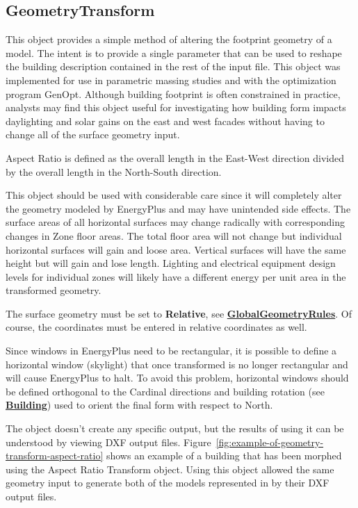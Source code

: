 \subsection{GeometryTransform}\label{geometrytransform}

This object provides a simple method of altering the footprint geometry of a model. The intent is to provide a single parameter that can be used to reshape the building description contained in the rest of the input file. This object was implemented for use in parametric massing studies and with the optimization program GenOpt. Although building footprint is often constrained in practice, analysts may find this object useful for investigating how building form impacts daylighting and solar gains on the east and west facades without having to change all of the surface geometry input.

Aspect Ratio is defined as the overall length in the East-West direction divided by the overall length in the North-South direction.

This object should be used with considerable care since it will completely alter the geometry modeled by EnergyPlus and may have unintended side effects. The surface areas of all horizontal surfaces may change radically with corresponding changes in Zone floor areas. The total floor area will not change but individual horizontal surfaces will gain and loose area. Vertical surfaces will have the same height but will gain and lose length. Lighting and electrical equipment design levels for individual zones will likely have a different energy per unit area in the transformed geometry.

The surface geometry must be set to \textbf{Relative}, see \textbf{\hyperref[globalgeometryrules]{GlobalGeometryRules}}. Of course, the coordinates must be entered in relative coordinates as well.

Since windows in EnergyPlus need to be rectangular, it is possible to define a horizontal window (skylight) that once transformed is no longer rectangular and will cause EnergyPlus to halt. To avoid this problem, horizontal windows should be defined orthogonal to the Cardinal directions and building rotation (see \textbf{\hyperref[building]{Building}}) used to orient the final form with respect to North.

The object doesn't create any specific output, but the results of using it can be understood by viewing DXF output files. Figure~\ref{fig:example-of-geometry-transform-aspect-ratio} shows an example of a building that has been morphed using the Aspect Ratio Transform object. Using this object allowed the same geometry input to generate both of the models represented in by their DXF output files.

